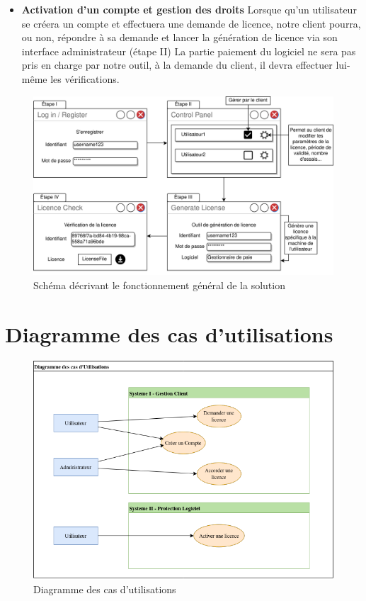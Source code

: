 \begin{itemize}
	\item \textbf{Activation d'un compte et gestion des droits} \newline
	Lorsque qu'un utilisateur se créera un compte et effectuera une demande de licence, notre client pourra, ou non, 
	répondre à sa demande et lancer la génération de licence via son interface administrateur (étape II)
	\newline
	La partie paiement du logiciel ne sera pas pris en charge par notre outil, à la demande du client,
	il devra effectuer lui-même les vérifications.
\end{itemize}

\newpage

\begin{figure}[h]
	\centering
	\vspace{4cm}
	\includegraphics[width=18cm]{main/png/STB.png}
	\caption{Schéma décrivant le fonctionnement général de la solution}
	\label{fig:fig1}
\end{figure}

\newpage

\section{Diagramme des cas d'utilisations}

\begin{figure}[h]
	\centering
	\includegraphics[width=16cm]{main/png/Util.png}
	\caption{Diagramme des cas d'utilisations}
	\label{fig:fig2}
\end{figure}

